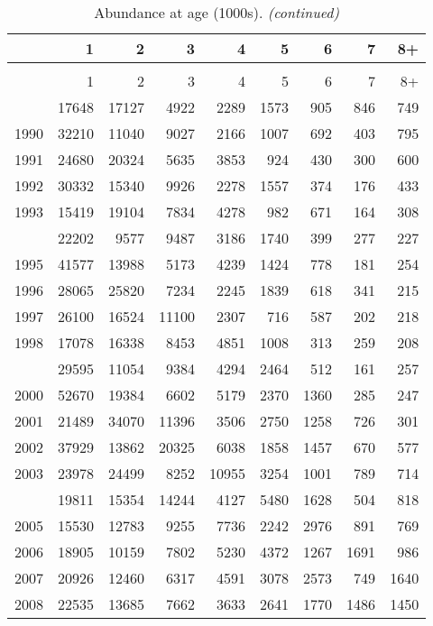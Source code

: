 \documentclass[
]{article}
\begin{document}
\begin{longtable}[t]{lrrrrrrrr}
\caption{\label{tab:NAA-table}Abundance at age (1000s).}\\
\toprule
  & 1 & 2 & 3 & 4 & 5 & 6 & 7 & 8+\\
\midrule
\endfirsthead
\caption[]{Abundance at age (1000s). \textit{(continued)}}\\
\toprule
  & 1 & 2 & 3 & 4 & 5 & 6 & 7 & 8+\\
\midrule
\endhead

\endfoot
\bottomrule
\endlastfoot
1989 & 17648 & 17127 & 4922 & 2289 & 1573 & 905 & 846 & 749\\
1990 & 32210 & 11040 & 9027 & 2166 & 1007 & 692 & 403 & 795\\
1991 & 24680 & 20324 & 5635 & 3853 & 924 & 430 & 300 & 600\\
1992 & 30332 & 15340 & 9926 & 2278 & 1557 & 374 & 176 & 433\\
1993 & 15419 & 19104 & 7834 & 4278 & 982 & 671 & 164 & 308\\
\addlinespace
1994 & 22202 & 9577 & 9487 & 3186 & 1740 & 399 & 277 & 227\\
1995 & 41577 & 13988 & 5173 & 4239 & 1424 & 778 & 181 & 254\\
1996 & 28065 & 25820 & 7234 & 2245 & 1839 & 618 & 341 & 215\\
1997 & 26100 & 16524 & 11100 & 2307 & 716 & 587 & 202 & 218\\
1998 & 17078 & 16338 & 8453 & 4851 & 1008 & 313 & 259 & 208\\
\addlinespace
1999 & 29595 & 11054 & 9384 & 4294 & 2464 & 512 & 161 & 257\\
2000 & 52670 & 19384 & 6602 & 5179 & 2370 & 1360 & 285 & 247\\
2001 & 21489 & 34070 & 11396 & 3506 & 2750 & 1258 & 726 & 301\\
2002 & 37929 & 13862 & 20325 & 6038 & 1858 & 1457 & 670 & 577\\
2003 & 23978 & 24499 & 8252 & 10955 & 3254 & 1001 & 789 & 714\\
\addlinespace
2004 & 19811 & 15354 & 14244 & 4127 & 5480 & 1628 & 504 & 818\\
2005 & 15530 & 12783 & 9255 & 7736 & 2242 & 2976 & 891 & 769\\
2006 & 18905 & 10159 & 7802 & 5230 & 4372 & 1267 & 1691 & 986\\
2007 & 20926 & 12460 & 6317 & 4591 & 3078 & 2573 & 749 & 1640\\
2008 & 22535 & 13685 & 7662 & 3633 & 2641 & 1770 & 1486 & 1450\\

\end{longtable}
\end{document}
